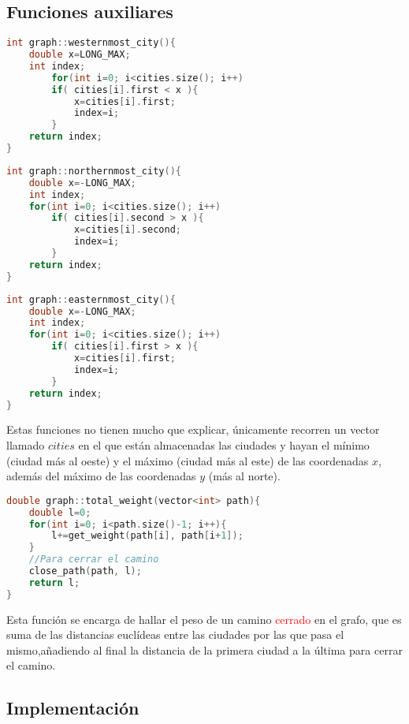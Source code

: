 \documentclass[11pt]{article}
\begin{document}
\subsection{Funciones auxiliares}
\begin{lstlisting}[language=C++, caption=Encontrar la ciudad más al oeste]
int graph::westernmost_city(){
	double x=LONG_MAX;
	int index;
		for(int i=0; i<cities.size(); i++)
		if( cities[i].first < x ){
			x=cities[i].first;
			index=i;
		}
	return index;
}
\end{lstlisting}

\begin{lstlisting}[language=C++, caption=Encontrar la ciudad más al norte]
int graph::northernmost_city(){
	double x=-LONG_MAX;
	int index;
	for(int i=0; i<cities.size(); i++)
		if( cities[i].second > x ){
			x=cities[i].second;
			index=i;
		}
	return index;
}
\end{lstlisting}

\begin{lstlisting}[language=C++, caption=Encontrar la ciudad más al este]
int graph::easternmost_city(){
	double x=-LONG_MAX;
	int index;
	for(int i=0; i<cities.size(); i++)
		if( cities[i].first > x ){
			x=cities[i].first;
			index=i;
		}
	return index;
}
\end{lstlisting}

Estas funciones no tienen mucho que explicar, únicamente recorren un vector llamado $cities$ en el que están almacenadas las ciudades y hayan el mínimo (ciudad más al oeste) y el máximo (ciudad más al este) de las coordenadas $x$, además del máximo de las coordenadas $y$ (más al norte).

\begin{lstlisting}[language=C++, caption=Hallar el peso de un camino cerrado]
double graph::total_weight(vector<int> path){
	double l=0;
	for(int i=0; i<path.size()-1; i++){
		l+=get_weight(path[i], path[i+1]);
	}
	//Para cerrar el camino
	close_path(path, l);
	return l;
}
\end{lstlisting}

Esta función se encarga de hallar el peso de un camino \textcolor{red}{cerrado} en el grafo, que es suma de las distancias euclídeas entre las ciudades por las que pasa el mismo,añadiendo al final la distancia de la primera ciudad a la última para cerrar el camino.\\

\subsection{Implementación}
\end{document}
